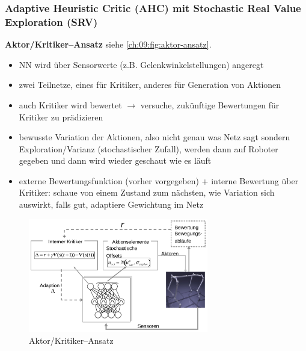 \subsubsection{Adaptive Heuristic Critic (AHC) mit Stochastic Real Value Exploration (SRV)}
\textbf{Aktor/Kritiker--Ansatz} siehe \autoref{ch:09:fig:aktor-ansatz}.
\begin{itemize}
\item NN wird über Sensorwerte (z.B. Gelenkwinkelstellungen) angeregt
\item zwei Teilnetze, eines für Kritiker, anderes für Generation von Aktionen
\item auch Kritiker wird bewertet $\rightarrow$ versuche, zukünftige Bewertungen für Kritiker zu prädizieren
\item bewusste Variation der Aktionen, also nicht genau was  Netz sagt sondern Exploration/Varianz (stochastischer Zufall), werden dann auf Roboter gegeben und dann wird wieder geschaut wie es läuft
\item externe Bewertungsfunktion (vorher vorgegeben) + interne Bewertung über Kritiker: schaue von einem Zustand zum nächsten, wie Variation sich auswirkt, falls gut, adaptiere Gewichtung im Netz
\end{itemize}
\begin{figure}[h!]
	\centering
	\includegraphics[width=0.7\textwidth]{figures/kritiker_ansatz.png}
	\caption{Aktor/Kritiker--Ansatz}
	\label{ch:09:fig:aktor-ansatz}
\end{figure}

